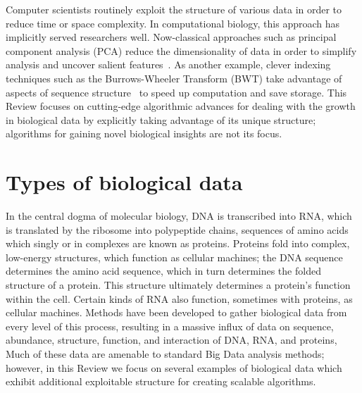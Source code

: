 \documentclass{acm_proc_article-sp}
\begin{document}
Computer scientists routinely exploit the structure of various data in
order to reduce time or space complexity.
In computational biology, this approach has implicitly served researchers well.
Now-classical approaches such as principal component analysis (PCA) reduce the 
dimensionality of data in order to simplify analysis and uncover salient 
features~\cite{berger2013computational}.
As another example, clever indexing techniques such as the Burrows-Wheeler 
Transform (BWT) take advantage of aspects of sequence 
structure~\cite{berger2013computational} to speed up computation and save storage.
This Review focuses on cutting-edge algorithmic advances for dealing with the growth in 
biological data by explicitly taking advantage of its unique structure; algorithms for gaining novel biological insights are not its 
focus.


\section{Types of biological data}

In the central dogma of molecular biology, DNA is transcribed into RNA, which
is translated by the ribosome into polypeptide chains, sequences of amino 
acids which singly or in complexes are known as proteins.
Proteins fold into complex, low-energy structures, which function as
cellular machines; the DNA sequence determines the amino acid sequence,
which in turn determines the folded structure of a protein.
This structure ultimately determines a protein's function within the cell.
Certain kinds of RNA also function, sometimes with proteins, as cellular 
machines.
Methods have been developed to gather biological data from every level of this process,
resulting in a massive influx of data on sequence, abundance, structure, function, and interaction of DNA, RNA, and proteins,
Much of these data are amenable to standard Big Data analysis methods; however, in this Review we focus on several examples of biological data which exhibit additional exploitable structure for creating scalable algorithms.
\end{document}
